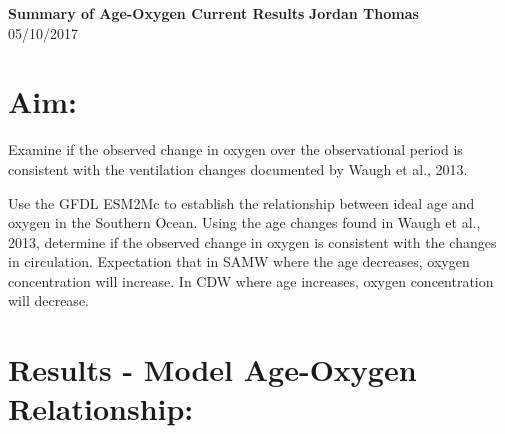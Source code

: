 \documentclass[11pt]{article}
\begin{document}
\noindent
\large\textbf{Summary of Age-Oxygen Current Results} \hfill \textbf{Jordan Thomas} \\
05/10/2017 \\

\section*{Aim:}

Examine if the observed change in oxygen over the observational period is
consistent with the ventilation changes documented by Waugh et al., 2013.

Use the GFDL ESM2Mc to establish the relationship between ideal age and oxygen
in the Southern Ocean. Using the age changes found in Waugh et al., 2013,
determine if the observed change in oxygen is consistent with the changes in
circulation. Expectation that in SAMW where the age decreases, oxygen
concentration will increase. In CDW where age increases, oxygen concentration
will decrease.

%


\section*{Results - Model Age-Oxygen Relationship:}
\end{document}
